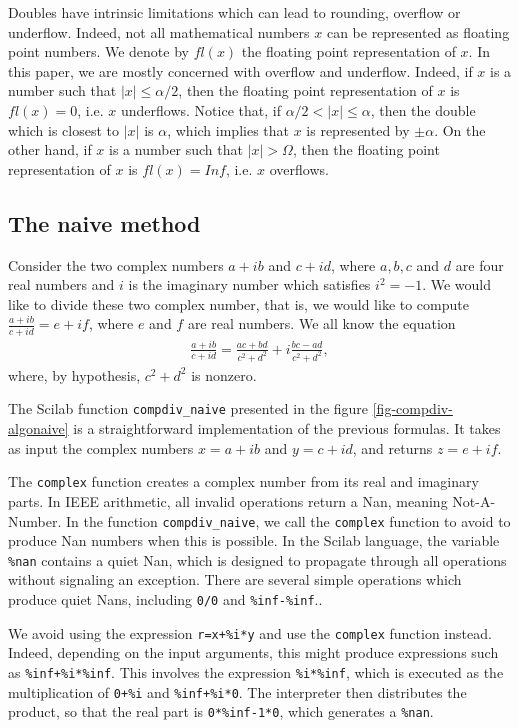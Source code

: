\documentclass{paper}
\newcommand{\scifun}[1]{\texttt{#1}}
\newcommand{\scivar}[1]{\texttt{#1}}
\begin{document}
Doubles have intrinsic limitations which can lead to 
rounding, overflow or underflow. 
Indeed, not all mathematical numbers $x$ 
can be represented as floating point numbers. 
We denote by $fl(x)$ the floating point representation of $x$. 
In this paper, we are mostly concerned with overflow and 
underflow. 
Indeed, if $x$ is a number such that $|x|\leq \alpha/2$, 
then the floating point representation of $x$ is 
$fl(x)=0$, i.e. $x$ underflows. 
Notice that, if $\alpha/2<|x|\leq \alpha$, then 
the double which is closest to $|x|$ is $\alpha$, which implies 
that $x$ is represented by $\pm \alpha$. 
On the other hand, if $x$ is a number such that $|x|>\Omega$, 
then the floating point representation of $x$ is 
$fl(x)=Inf$, i.e. $x$ overflows.


\subsection{The naive method}

Consider the two complex numbers $a + ib$ and $c + id$, where 
$a,b,c$ and $d$ are four real numbers and $i$ is 
the imaginary number which satisfies $i^2=-1$. 
We would like to divide these two complex number, 
that is, we would like to compute $\frac{a + ib}{c + id}=e+if$, 
where $e$ and $f$ are real numbers.
We all know the equation
\begin{eqnarray}
\label{compdiv-eq-defcomplexdiv}
\frac{a + ib}{c + id} = \frac{ac + bd}{c^2 + d^2} + i \frac{bc - ad}{c^2 + d^2},
\end{eqnarray}
where, by hypothesis, $c^2 + d^2$ is nonzero.

The Scilab function \scifun{compdiv\_naive} presented in the figure \ref{fig-compdiv-algonaive} 
is a straightforward implementation of the previous formulas. 
It takes as input the complex numbers $x=a+ib$ and $y=c+id$, 
and returns $z=e+if$.

The \scifun{complex} function creates a complex number from its 
real and imaginary parts. 
In IEEE arithmetic, all invalid operations return a Nan, meaning Not-A-Number. 
In the function \scifun{compdiv\_naive}, we call the \scifun{complex} function 
to avoid to produce Nan numbers when this is possible.
In the Scilab language, the variable \scivar{\%nan} contains a quiet Nan, 
which is designed to propagate through all operations without 
signaling an exception. 
There are several simple operations which produce 
quiet Nans, including \scivar{0/0} and \scivar{\%inf-\%inf}.. 

We avoid using the expression \scivar{r=x+\%i*y} and 
use the \scifun{complex} function instead. 
Indeed, depending on the input arguments, this might produce expressions 
such as \scivar{\%inf+\%i*\%inf}.
This involves the expression \scivar{\%i*\%inf}, 
which is executed as the multiplication of 
\scivar{0+\%i} and \scivar{\%inf+\%i*0}. 
The interpreter then distributes the product, so that the real part is 
\scivar{0*\%inf-1*0}, which generates a \scivar{\%nan}.
\end{document}
